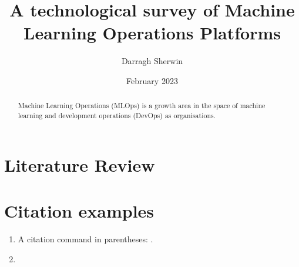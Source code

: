 \documentclass[12pt, a4paper]{article}
\title{A technological survey of Machine Learning Operations Platforms}
\author{Darragh Sherwin}
\date{February 2023}
\begin{document}
\maketitle
\begin{abstract}
Machine Learning Operations (MLOps) is a growth area in the space of machine learning and development operations (DevOps) as organisations.

\end{abstract}

\section{Literature Review}

\section*{Citation examples}

\begin{enumerate}

\item A citation command in parentheses: \autocite{rufDemystifyingMLOpsPresenting2021}.
\item 

\end{enumerate}

\printbibliography
\end{document}
